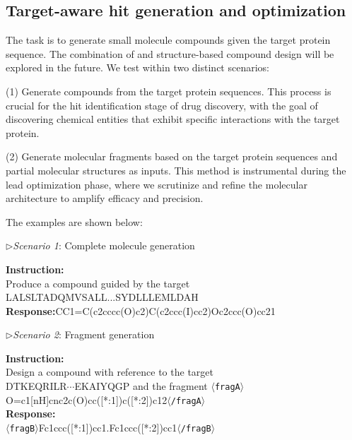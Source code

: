 \subsection{Target-aware hit generation and optimization}\label{sec:tamgen}
The task is to generate small molecule compounds given the target protein sequence. The combination of \ourM{} and structure-based compound design will be explored in the future. We test \ourM{} within two distinct scenarios: 

(1) Generate compounds from the target protein sequences. This process is crucial for the hit identification stage of drug discovery, with the goal of discovering  chemical entities that exhibit specific interactions with the target protein. 

(2) Generate molecular fragments based on the target protein sequences and partial molecular structures as inputs. This method is instrumental during the lead optimization phase, where we scrutinize and refine the molecular architecture to amplify efficacy and precision.

The examples are shown below:

\begin{example}  

\noindent$\rhd${\em Scenario 1}: Complete molecule generation

\noindent\textbf{Instruction: }\\Produce a compound guided by the target \\
\noindent\pro{}LALSLTADQMVSALL...SYDLLLEMLDAH\epro{} \\
\noindent\textbf{Response:}\mol{}CC1=C(c2cccc(O)c2)C(c2ccc(I)cc2)Oc2ccc(O)cc21\emol{}


\noindent$\rhd${\em Scenario 2}: Fragment generation

\noindent\textbf{Instruction: }\\Design a compound with reference to the target \\
\pro{}DTKEQRILR$\cdots$EKAIYQGP\epro{} and the fragment  $\langle$\texttt{fragA}$\rangle$O=c1[nH]cnc2c(O)cc([*:1])c([*:2])c12$\langle$\texttt{/fragA}$\rangle$\\
        \textbf{Response: }\\$\langle$\texttt{fragB}$\rangle$Fc1ccc([*:1])cc1.Fc1ccc([*:2])cc1$\langle$\texttt{/fragB}$\rangle$
\end{example}  

